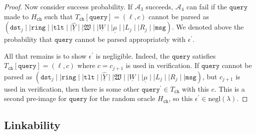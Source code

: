 \documentclass[11pt]{article}
\theoremstyle{definition}
\newcommand{\tlt}{\texttt{tlt}}
\newcommand{\ring}{\texttt{ring}}
\newcommand{\secpar}{\lambda}
\newcommand{\msg}{\texttt{msg}}
\newcommand{\negl}{\text{negl}(\secpar)}
\newcommand{\signaturequery}{(\texttt{dst}_{j} \mid \mid \ring \mid \mid \tlt \mid \mid \underline{\widehat{Y}} \mid \mid \mathfrak{W} \mid \mid \underline{W} \mid \mid \underline{\mu} \mid \mid L_{j} \mid \mid R_{j} \mid \mid \msg)}
\begin{document}
\begin{proof}
Now consider success probability. If $\mathcal{A}_3$ succeeds, $\mathcal{A}_4$ can fail if the $\texttt{query}$ made to $H_{\texttt{ch}}$ such that $T_{\texttt{ch}}[\texttt{query}]=(\ell, c)$ cannot be parsed as $\signaturequery$. We denoted above the probability that $\texttt{query}$ cannot be parsed appropriately with $\epsilon^\prime$.

All that remains is to show $\epsilon^\prime$ is negligible. Indeed, the $\texttt{query}$ satisfies $T_{\texttt{ch}}[\texttt{query}]=(\ell, c)$ where $c=c_{j+1}$ is used in verification.  If $\texttt{query}$ cannot be parsed as $\signaturequery$, but $c_{j+1}$ is used in verification, then there is some other $\texttt{query}^\prime \in T_{\texttt{ch}}$ with this $c$. This is a second pre-image for $\texttt{query}$ for the random oracle $H_{\texttt{ch}}$, so this $\epsilon^\prime \in \negl$.

\end{proof}



\subsection{Linkability}
\end{document}
